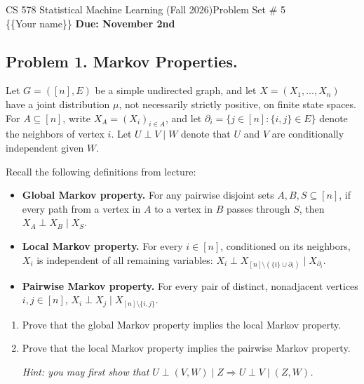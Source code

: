 \documentclass[12pt]{article}
\theoremstyle{plain}
\theoremstyle{definition}
\begin{document}
\noindent CS 578 Statistical Machine Learning (Fall 2026)\hfill Problem Set \# 5\\
\{\{Your name\}\} \hfill \textbf{Due: November 2nd}

\noindent\hrulefill

\subsection*{Problem 1. Markov Properties.}
Let \(G=([n],E)\) be a simple undirected graph, and let \(X=(X_1,\ldots,X_n)\) have a joint distribution \(\mu\), not necessarily strictly positive, on finite state spaces. For \(A\subseteq[n]\), write \(X_A=(X_i)_{i\in A}\), and let \(\partial_i=\{j\in[n]:\{i,j\}\in E\}\) denote the neighbors of vertex \(i\). Let \(U\perp V\mid W\) denote that \(U\) and \(V\) are conditionally independent given \(W\).

Recall the following definitions from lecture:
\begin{itemize}
    \item \textbf{Global Markov property.} For any pairwise disjoint sets \(A,B,S\subseteq[n]\), if every path from a vertex in \(A\) to a vertex in \(B\) passes through \(S\), then $X_A\perp X_B\mid X_S$.

    \item \textbf{Local Markov property.} For every \(i\in[n]\), conditioned on its neighbors, \(X_i\) is independent of all remaining variables: $X_i\perp X_{[n]\setminus(\{i\}\cup\partial_i)}
        \mid X_{\partial_i}$.
        
    \item \textbf{Pairwise Markov property.} For every pair of distinct, nonadjacent vertices \(i,j\in[n]\), $X_i\perp X_j\mid X_{[n]\setminus\{i,j\}}$.
\end{itemize}

\begin{enumerate}
    \item Prove that the global Markov property implies the local Markov property.
    \item Prove that the local Markov property implies the pairwise Markov property.

    \emph{Hint: you may first show that $U\perp(V,W)\mid Z\Longrightarrow U\perp V\mid(Z,W)$.}
\end{enumerate}

\end{document}
